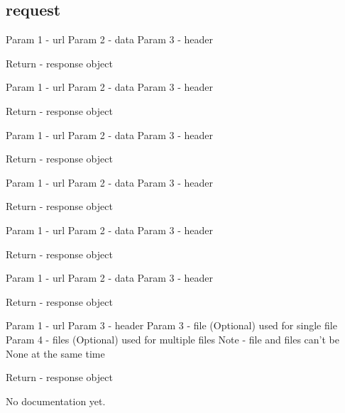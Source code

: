 \subsection{request}
{Param 1 - url
Param 2 - data
Param 3 - header

Return - response object}
{Param 1 - url
Param 2 - data
Param 3 - header

Return - response object}
{Param 1 - url
Param 2 - data
Param 3 - header

Return - response object}
{Param 1 - url
Param 2 - data
Param 3 - header

Return - response object}
{Param 1 - url
Param 2 - data
Param 3 - header

Return - response object}
{Param 1 - url
Param 2 - data
Param 3 - header

Return - response object}
{Param 1 - url
Param 3 - header
Param 3 - file (Optional) used for single file
Param 4 - files (Optional) used for multiple files
Note - file and files can't be None at the same time

Return - response object}
{No documentation yet.}
